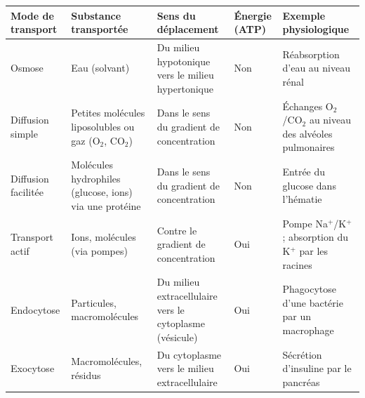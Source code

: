 \documentclass[11pt]{article}
\begin{document}
\begin{corrige}
\begin{center}
\begin{tabularx}{\linewidth}{|l|X|X|X|X|}
\hline
\rowcolor{popblueL} \textbf{Mode de transport} & \textbf{Substance transportée} & \textbf{Sens du déplacement} & \textbf{Énergie (ATP)} & \textbf{Exemple physiologique} \\
\hline
Osmose & Eau (solvant) & Du milieu hypotonique vers le milieu hypertonique & Non & Réabsorption d'eau au niveau rénal \\
\hline
Diffusion simple & Petites molécules liposolubles ou gaz (O$_2$, CO$_2$) & Dans le sens du gradient de concentration & Non & Échanges O$_2$/CO$_2$ au niveau des alvéoles pulmonaires \\
\hline
Diffusion facilitée & Molécules hydrophiles (glucose, ions) via une protéine & Dans le sens du gradient de concentration & Non & Entrée du glucose dans l'hématie \\
\hline
Transport actif & Ions, molécules (via pompes) & Contre le gradient de concentration & Oui & Pompe Na$^+$/K$^+$ ; absorption du K$^+$ par les racines \\
\hline
Endocytose & Particules, macromolécules & Du milieu extracellulaire vers le cytoplasme (vésicule) & Oui & Phagocytose d'une bactérie par un macrophage \\
\hline
Exocytose & Macromolécules, résidus & Du cytoplasme vers le milieu extracellulaire & Oui & Sécrétion d'insuline par le pancréas \\
\hline
\end{tabularx}
\end{center}
\end{corrige}
\end{document}
